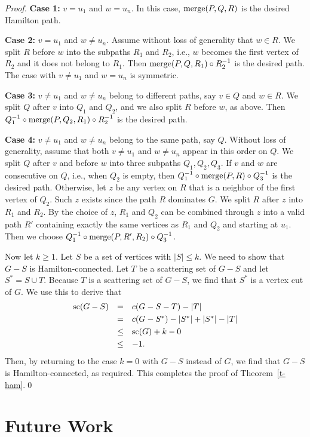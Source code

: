 \documentclass{llncs}
\DeclareMathOperator{\scat}{{\rm sc}}
\DeclareMathOperator{\merg}{{\rm merge}}
\newcommand\pcase[1] {\medskip\par\noindent \textbf{#1}}
\begin{document}
\begin{proof}
\pcase{Case 1:} $v=u_1$ and $w=u_n$. In this case, $\merg(P,Q,R)$ is the desired Hamilton path.

\pcase{Case 2:} $v=u_1$ and $w\ne u_n$. Assume without loss of generality that $w\in R$.
We split $R$ before $w$ into the subpaths $R_1$ and $R_2$, i.e., $w$ becomes the first vertex of $R_2$ 
and it does not belong to $R_1$.
Then $\merg(P,Q,R_1)\circ R_2^{-1}$ is the desired path. The case with $v\ne u_1$ and $w=u_n$ is symmetric.

\pcase{Case 3:} $v\ne u_1$ and $w\ne u_n$ belong to different paths, say $v\in Q$ and $w\in R$. We split 
$Q$ after $v$ into $Q_1$ and $Q_2$, and we also split $R$ before $w$, as above.
Then $Q_1^{-1}\circ \merg(P,Q_2,R_1)\circ R_2^{-1}$ is the desired path.

\pcase{Case 4:} $v\ne u_1$ and $w\ne u_n$ belong to the same path, say $Q$. Without loss of generality, assume that both $v\ne u_1$ and $w\ne u_n$ appear in this order on $Q$. 
We split $Q$ after $v$ and before $w$ 
into three subpaths $Q_1,Q_2,Q_3$. If $v$ and $w$ are consecutive on $Q$, i.e., when $Q_2$ is empty, then 
$Q_1^{-1}\circ \merg(P,R)\circ Q_3^{-1}$ is the desired path.
Otherwise, let $z$ be any vertex on $R$ that is a neighbor of the first vertex of $Q_2$. Such $z$ exists since
the path $R$ dominates $G$. 
We split $R$ after $z$ into $R_1$ and $R_2$. By the choice of $z$, $R_1$ and $Q_2$ can be combined through $z$ into a valid path $R'$ containing exactly the same vertices as $R_1$ and $Q_2$ and starting at $u_1$.   
Then we choose $Q_1^{-1}\circ \merg(P,R',R_2)\circ Q_3^{-1}$.

\medskip
\noindent
Now let $k\geq 1$.
Let $S$ be a set of vertices with $|S|\leq k$. We need to show that $G-S$ is Hamilton-connected. Let $T$ be a scattering set of $G-S$ and let $S^*=S\cup T$.
Because $T$ is a scattering set of  $G-S$, we find that $S^*$ is a vertex cut of $G$. We use this to derive that
\[
\begin{array}{lcl}
\scat(G-S)&=&c(G-S-T)-|T|\\[3pt]
&= &c(G-S^*)-|S^*|+|S^*|-|T|\\[3pt]
&\leq &\scat(G)+k-0\\[3pt]
&\leq &-1.
\end{array}
\]
Then, by returning to the case $k=0$ with $G-S$ instead of $G$, we find that $G-S$ is Hamilton-connected, as required. This completes the proof of Theorem~\ref{t-ham}.\qed
\end{proof}


\section{Future Work}\label{s-con}
\end{document}
